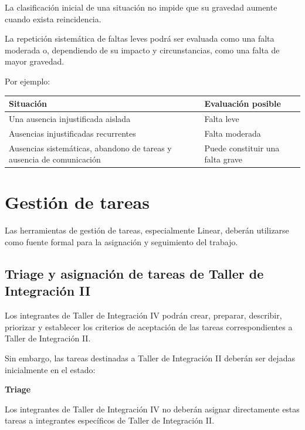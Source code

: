 \documentclass[12pt,a4paper]{article}
\begin{document}
La clasificación inicial de una situación no impide que su gravedad aumente cuando exista reincidencia.

La repetición sistemática de faltas leves podrá ser evaluada como una falta moderada o, dependiendo de su impacto y circunstancias, como una falta de mayor gravedad.

Por ejemplo:

\begin{center}
\begin{tabularx}{0.9\textwidth}{
    >{\raggedright\arraybackslash}X
    >{\raggedright\arraybackslash}X
}
\textbf{Situación} & \textbf{Evaluación posible} \\ \hline

Una ausencia injustificada aislada
&
Falta leve
\\

Ausencias injustificadas recurrentes
&
Falta moderada
\\

Ausencias sistemáticas, abandono de tareas y ausencia de comunicación
&
Puede constituir una falta grave
\\

\end{tabularx}
\end{center}

\section{Gestión de tareas}

Las herramientas de gestión de tareas, especialmente Linear, deberán utilizarse como fuente formal para la asignación y seguimiento del trabajo.

\subsection{Triage y asignación de tareas de Taller de Integración II}

Los integrantes de Taller de Integración IV podrán crear, preparar, describir, priorizar y establecer los criterios de aceptación de las tareas correspondientes a Taller de Integración II.

Sin embargo, las tareas destinadas a Taller de Integración II deberán ser dejadas inicialmente en el estado:

\begin{center}
    \textbf{Triage}
\end{center}

Los integrantes de Taller de Integración IV no deberán asignar directamente estas tareas a integrantes específicos de Taller de Integración II.
\end{document}
